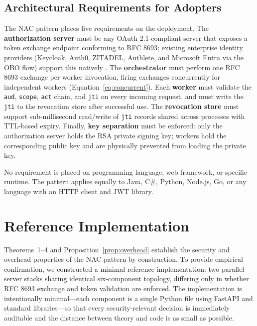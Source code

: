 \documentclass[journal]{IEEEtran}
\begin{document}
\subsection{Architectural Requirements for Adopters}

The NAC pattern places five requirements on the deployment. The
\textbf{authorization server} must be any OAuth 2.1-compliant server that
exposes a token exchange endpoint conforming to RFC 8693; existing enterprise
identity providers (Keycloak, Auth0, ZITADEL, Authlete, and Microsoft Entra via
the OBO flow) support this natively \cite{rfc8693_deploy}. The
\textbf{orchestrator} must perform one RFC 8693 exchange per worker invocation,
firing exchanges concurrently for independent workers
(Equation~\ref{eq:concurrent}). Each \textbf{worker} must validate the
\texttt{aud}, \texttt{scope}, \texttt{act} chain, and \texttt{jti} on every
incoming request, and must write the \texttt{jti} to the revocation store after
successful use. The \textbf{revocation store} must support sub-millisecond
read/write of \texttt{jti} records shared across processes with TTL-based
expiry. Finally, \textbf{key separation} must be enforced: only the
authorization server holds the RSA private signing key; workers hold the
corresponding public key and are physically prevented from loading the private
key.

No requirement is placed on programming language, web framework, or specific
runtime. The pattern applies equally to Java, C\#, Python, Node.js, Go, or any
language with an HTTP client and JWT library.


\section{Reference Implementation}
\label{sec:impl}

Theorems~1--4 and Proposition~\ref{prop:overhead} establish the security and
overhead properties of the NAC pattern by construction. To provide empirical
confirmation, we constructed a minimal reference implementation: two parallel
server stacks sharing identical six-component topology, differing only in
whether RFC 8693 exchange and token validation are enforced. The implementation
is intentionally minimal---each component is a single Python file using FastAPI
and standard libraries---so that every security-relevant decision is
immediately auditable and the distance between theory and code is as small as
possible.
\end{document}
